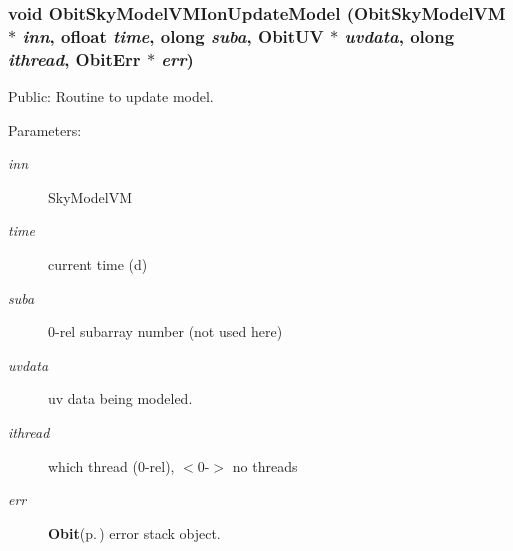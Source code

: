 \subsubsection{\setlength{\rightskip}{0pt plus 5cm}void Obit\-Sky\-Model\-VMIon\-Update\-Model ({\bf Obit\-Sky\-Model\-VM} $\ast$ {\em inn}, {\bf ofloat} {\em time}, {\bf olong} {\em suba}, {\bf Obit\-UV} $\ast$ {\em uvdata}, {\bf olong} {\em ithread}, {\bf Obit\-Err} $\ast$ {\em err})}\label{ObitSkyModelVMIon_8h_a13}


Public: Routine to update model. 

\begin{Desc}
\item[Parameters:]
\begin{description}
\item[{\em inn}]Sky\-Model\-VM \item[{\em time}]current time (d) \item[{\em suba}]0-rel subarray number (not used here) \item[{\em uvdata}]uv data being modeled. \item[{\em ithread}]which thread (0-rel), $<$0-$>$ no threads \item[{\em err}]{\bf Obit}{\rm (p.\,\pageref{structObit})} error stack object. \end{description}
\end{Desc}
